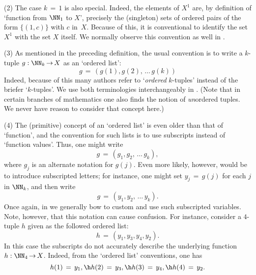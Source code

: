 {\V

        (2) The case $k \,=\, 1$ is also special. Indeed, the elements of $X^{1}$ are, by definition of `function from ${\NN}_{1}$ to $X$',
    precisely the (singleton) sets of ordered pairs of the form $\{(1,c)\}$ with $c$ in~$X$.
    Because of this, it is conventional to identify the set $X^{1}$ with the set $X$ itself.
    We normally observe this convention as well in {\TheseNotes}.

\V

        (3) As mentioned in the preceding definition, the usual convention is to write a $k$-tuple $g:{\NN}_{k} \,{\rightarrow}\, X$ as an `ordered list':
        \begin{displaymath}
        g \,=\, (g(1),g(2),\,{\ldots}\,g(k))
        \end{displaymath}
    Indeed, because of this many authors refer to `{\em ordered} $k$-tuples' instead of the briefer `$k$-tuples'.
    We use both terminologies interchangeably in {\ThisText}.
    (Note that in certain branches of mathematics one also finds the notion of {\em un}ordered tuples. We never have reason to consider that concept here.)

\V

        (4) The (primitive) concept of an `ordered list' is even older than that of `function',
    and the convention for such lists is to use subscripts instead of `function values'. Thus, one might write
        \begin{displaymath}
        g \,=\, (g_{1},g_{2},\,{\ldots}\,g_{k}),
        \end{displaymath}
    where $g_{j}$ is an alternate notation for $g(j)$. Even more likely, however, would be to introduce subscripted letters;
    for instance, one might set $y_{j} \,=\, g(j)$ for each $j$ in ${\NN}_{k}$, and then write
        \begin{displaymath}
        g \,=\, (y_{1},y_{2},\,{\ldots}\,y_{k}).
        \end{displaymath}
    Once again, in {\TheseNotes} we generally bow to custom and use such subscripted variables.
    Note, however, that this notation can cause confusion. For instance, consider a $4$-tuple $h$ given as the followed ordered list:
        \begin{displaymath}
        h \,=\, (y_{1},y_{3},y_{4}, y_{2}).
        \end{displaymath}
    In this case the subscripts do not accurately describe the underlying function $h:{\NN}_{4} \,{\rightarrow}\, X$.
    Indeed, from the `ordered list' conventions, one has
        \begin{displaymath}
        h(1) \,=\, y_{1}, \h h(2) \,=\, y_{3}, \h h(3) \,=\, y_{4}, \h h(4) \,=\, y_{2}.
        \end{displaymath}

}
